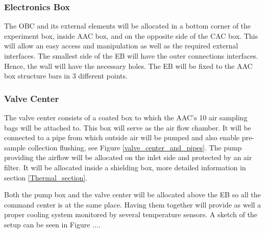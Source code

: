 \pagebreak
\subsubsection{Electronics Box}

The OBC and its external elements will be allocated in a bottom corner of the experiment box, inside AAC box, and on the opposite side of the CAC box. This will allow an easy access and manipulation as well as the required external interfaces. The smallest side of the EB will have the outer connections interfaces. Hence, the wall will have the necessary holes. The EB will be fixed to the AAC box structure bars in 3 different points.




\pagebreak
\subsubsection{Valve Center}

The valve center consists of a coated box to which the AAC's 10 air sampling bags will be attached to. This box will serve as the air flow chamber. It will be connected to a pipe from which outside air will be pumped and also enable pre-sample collection flushing, see Figure \ref{valve_center_and_pipes}. The pump providing the airflow will be allocated on the inlet side and protected by an air filter. It will be allocated inside a shielding box, more detailed information in section \ref{Thermal_section}.

\smallskip
Both the pump box and the valve center will be allocated above the EB so all the command center is at the same place. Having them together will provide as well a proper cooling system monitored by several temperature sensors. A sketch of the setup can be seen in Figure ....



